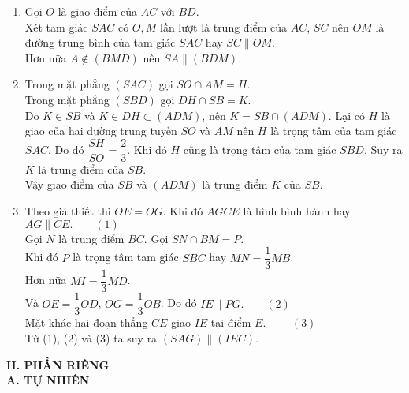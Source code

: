 \begin{bt}
{\begin{center}
		\end{center}
\begin{enumerate}
\item Gọi $O$ là giao điểm của $AC$ với $BD$.\\
						Xét tam giác $SAC$ có $O, M$ lần lượt là trung điểm của $AC$, $SC$ nên $OM$ là đường trung bình của tam giác $SAC$ hay $SC\parallel OM$.\\
					Hơn nữa $A\notin (BMD)$ nên $SA\parallel(BDM)$.
\item Trong mặt phẳng $(SAC)$ gọi $SO\cap AM =H$.\\
Trong mặt phẳng $(SBD)$ gọi $DH\cap SB =K$.\\
Do $K\in SB$ và $K\in DH\subset (ADM)$, nên $K=SB\cap (ADM)$. Lại có $H$ là giao của hai đường trung tuyến $SO$ và $AM$ nên $H$ là trọng tâm của tam giác $SAC$. Do đó $\dfrac{SH}{SO} = \dfrac{2}{3}$. Khi đó $H$ cũng là trọng tâm của tam giác $SBD$. Suy ra $K$ là trung điểm của $SB$.\\
Vậy giao điểm của $SB$ và $(ADM)$ là trung điểm $K$ của $SB$.
\item Theo giả thiết thì $OE = OG$.
Khi đó $AGCE$ là hình bình hành hay $AG\parallel CE. \quad\quad (1)$\\
Gọi $N$ là trung điểm $BC$. Gọi $SN\cap BM=P$. \\
Khi đó $P$ là trọng tâm tam giác $SBC$ hay $MN=\dfrac{1}{3}MB$.\\
Hơn nữa $MI=\dfrac{1}{3}MD$.\\
Và $OE=\dfrac{1}{3}OD$, $OG=\dfrac{1}{3}OB$.
Do đó $IE\parallel PG. \quad\quad (2)$\\
Mặt khác hai đoạn thẳng $CE$ giao $IE$ tại điểm $E$. $\quad\quad (3)$\\
Từ (1), (2) và (3) ta suy ra $(SAG)\parallel (IEC)$.	
\end{enumerate}
		}
\end{bt}
\noindent\textbf{II. PHẦN RIÊNG} \\
\noindent\textbf{A. TỰ NHIÊN} 

